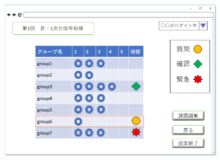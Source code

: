 

\begin{figure}[htbp]
 \begin{minipage}{0.5\hsize}
  \begin{center}
   \includegraphics[width=1\linewidth,clip]{./img/20.png}
  \end{center}


\end{minipage}
\end{figure}
